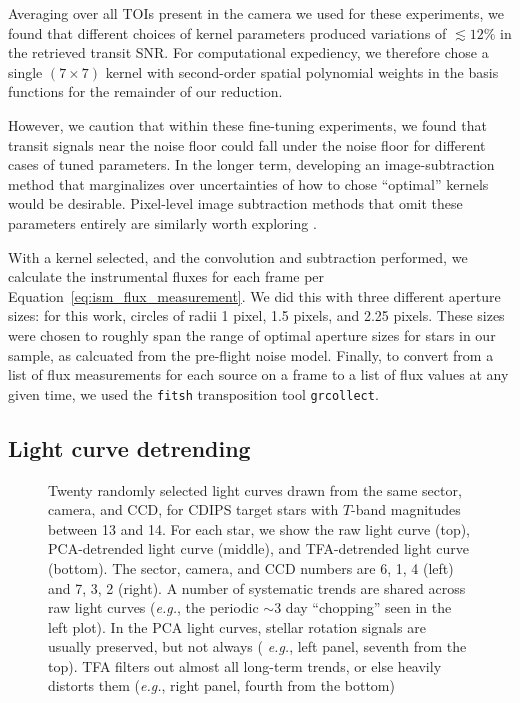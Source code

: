 \documentclass[12pt,twocolumn,tighten]{aastex62}
\begin{document}
Averaging over all TOIs present in the camera we used for these
experiments, we found that different choices of kernel parameters
produced variations of $\lesssim 12\%$ in the retrieved transit SNR.  
For computational expediency, we therefore chose a single $(7\times
7)$ kernel with second-order spatial polynomial weights in the basis
functions for the remainder of our reduction.

However, we caution that within these fine-tuning experiments, we
found that transit signals near the noise floor could fall under the
noise floor for different cases of tuned parameters.  In the longer
term, developing an image-subtraction method that marginalizes over
uncertainties of how to chose ``optimal'' kernels would be desirable.
Pixel-level image subtraction methods that omit these parameters
entirely are similarly worth exploring \citep{wang_pixel-level_2017}.

With a kernel selected, and the convolution and subtraction performed,
we calculate the instrumental fluxes for each frame per
Equation~\ref{eq:ism_flux_measurement}.  We did this with three
different aperture sizes: for this work, circles of radii 1 pixel, 1.5
pixels, and 2.25 pixels.  These sizes were chosen to roughly span the
range of optimal aperture sizes for stars in our sample, as calcuated
from the pre-flight \citet{Sullivan_et_al_2015} noise model.  Finally,
to convert from a list of flux measurements for each source on a frame
to a list of flux values at any given time, we used the
\texttt{fitsh} transposition tool \texttt{grcollect}.

\subsection{Light curve detrending}
\label{subsec:lcdetrending}

\begin{figure}[!t]
	\vspace{-0.5cm}
	\caption{
    Twenty randomly selected light curves drawn from the same sector,
    camera, and CCD, for CDIPS target stars with $T$-band magnitudes
    between 13 and 14.  For each star, we show the raw light curve
    (top), PCA-detrended light curve (middle), and TFA-detrended light
    curve (bottom).  The sector, camera, and CCD numbers are 6, 1, 4
    (left) and 7, 3, 2 (right).  A number of systematic trends are
    shared across raw light curves ({\it e.g.}, the periodic $\sim$3 day
    ``chopping'' seen in the left plot).  In the PCA light curves,
    stellar rotation signals are usually preserved, but not always ({\it
    e.g.}, left panel, seventh from the top).  TFA filters out almost
    all long-term trends, or else heavily distorts them ({\it e.g.},
    right panel, fourth from the bottom)
	\label{fig:lc_systematics_dtr}
	}
\end{figure}
\end{document}
